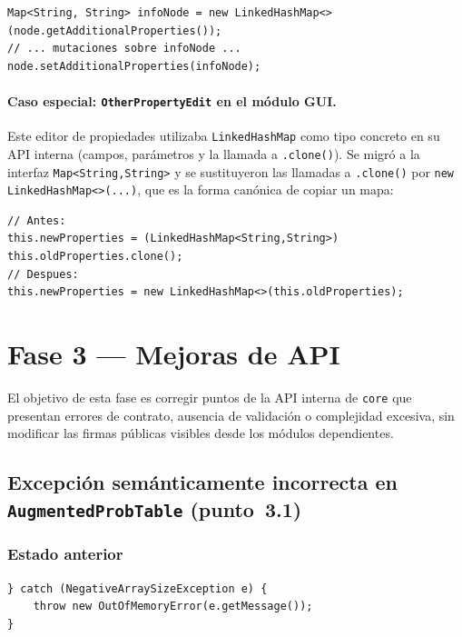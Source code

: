 \documentclass[11pt,a4paper]{article}
\newcommand{\code}[1]{\texttt{#1}}
\begin{document}
\begin{lstlisting}
Map<String, String> infoNode = new LinkedHashMap<>(node.getAdditionalProperties());
// ... mutaciones sobre infoNode ...
node.setAdditionalProperties(infoNode);
\end{lstlisting}

\paragraph{Caso especial: \code{OtherPropertyEdit} en el módulo GUI.}

Este editor de propiedades utilizaba \code{LinkedHashMap} como tipo concreto
en su API interna (campos, parámetros y la llamada a \code{.clone()}).
Se migró a la interfaz \code{Map<String,String>} y se sustituyeron las
llamadas a \code{.clone()} por \code{new LinkedHashMap<>(...)}, que es
la forma canónica de copiar un mapa:

\begin{lstlisting}
// Antes:
this.newProperties = (LinkedHashMap<String,String>) this.oldProperties.clone();
// Despues:
this.newProperties = new LinkedHashMap<>(this.oldProperties);
\end{lstlisting}

\section{Fase 3 --- Mejoras de API}

El objetivo de esta fase es corregir puntos de la API interna de
\code{core} que presentan errores de contrato, ausencia de validación
o complejidad excesiva, sin modificar las firmas públicas visibles
desde los módulos dependientes.

\subsection{Excepción semánticamente incorrecta en
            \code{AugmentedProbTable} (punto~3.1)}

\subsubsection*{Estado anterior}

\begin{lstlisting}
} catch (NegativeArraySizeException e) {
    throw new OutOfMemoryError(e.getMessage());
}
\end{lstlisting}
\end{document}
